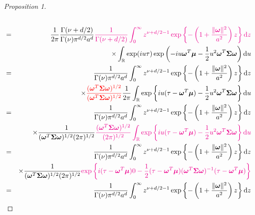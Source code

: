 \documentclass[12pt]{article}
\newcommand{\0}{\mathbf{0}}
\newtheorem{proof}{Proof}
\begin{document}
\begin{proof}[Proposition 1]
\begin{eqnarray}
&&  \label{eqn:gneitingspectraldensitymatern}  \\
&=&\frac{1}{2\pi}\frac{\Gamma(\nu+d/2)}{ \Gamma(\nu)\pi^{d/2}a^{d}} \textcolor{magenta}{\frac{1}{\Gamma(\nu+d/2)}\int_0^{\infty}z^{\nu+d/2-1} \exp\left\{-\left(1+\frac{ \|\boldsymbol{\omega}\|^2}{a^2}\right)z\right\}\dd z}\nonumber \\
&&\times  \int_{\mathbb{R}} \exp(iu\tau) \exp\left(-iu\boldsymbol{\omega}^T\boldsymbol{\mu}-\frac{1}{2}u^2\boldsymbol{\omega}^T\boldsymbol{\Sigma}\boldsymbol{\omega}\right) \dd u 
\label{eqn:rational_function_integral_form} \\
&=&\frac{1}{ \Gamma(\nu)\pi^{d/2}a^{d}} \int_0^{\infty}z^{\nu+d/2-1} \exp\left\{-\left(1+\frac{ \|\boldsymbol{\omega}\|^2}{a^2}\right)z\right\}\dd z\nonumber \\
&&\times \textcolor{red}{\frac{(\boldsymbol{\omega}^T\boldsymbol{\Sigma}\boldsymbol{\omega})^{1/2}}{(\boldsymbol{\omega}^T\boldsymbol{\Sigma}\boldsymbol{\omega})^{1/2}}}\frac{1}{2\pi} \int_{\mathbb{R}} \exp\left\{iu(\tau-\boldsymbol{\omega}^T\boldsymbol{\mu})-\frac{1}{2}u^2\boldsymbol{\omega}^T\boldsymbol{\Sigma}\boldsymbol{\omega}\right\} \dd u  \nonumber \\
&=&\frac{1}{ \Gamma(\nu)\pi^{d/2}a^{d}} \int_0^{\infty}z^{\nu+d/2-1} \exp\left\{-\left(1+\frac{ \|\boldsymbol{\omega}\|^2}{a^2}\right)z\right\}\dd z\nonumber \\
&& \times \frac{1}{(\boldsymbol{\omega}^T\boldsymbol{\Sigma}\boldsymbol{\omega})^{1/2}(2\pi)^{1/2}}\textcolor{magenta}{\frac{(\boldsymbol{\omega}^T\boldsymbol{\Sigma}\boldsymbol{\omega})^{1/2}}{(2\pi)^{1/2}} \int_{\mathbb{R}} \exp\left\{iu(\tau-\boldsymbol{\omega}^T\boldsymbol{\mu})-\frac{1}{2}u^2\boldsymbol{\omega}^T\boldsymbol{\Sigma}\boldsymbol{\omega}\right\} \dd u } \label{eqn:CFofGaussian1} \\
&=&\frac{1}{ \Gamma(\nu)\pi^{d/2}a^{d}} \int_0^{\infty}z^{\nu+d/2-1} \exp\left\{-\left(1+\frac{ \|\boldsymbol{\omega}\|^2}{a^2}\right)z\right\} \dd z \nonumber \\
&&\times \frac{1}{(\boldsymbol{\omega}^T\boldsymbol{\Sigma}\boldsymbol{\omega})^{1/2}(2\pi)^{1/2}} \textcolor{magenta}{ \exp\left\{i(\tau-\boldsymbol{\omega}^T\boldsymbol{\mu})0-\frac{1}{2}(\tau-\boldsymbol{\omega}^T\boldsymbol{\mu})(\boldsymbol{\omega}^T\boldsymbol{\Sigma}\boldsymbol{\omega})^{-1}(\tau-\boldsymbol{\omega}^T\boldsymbol{\mu})\right\}}  \nonumber \\
&=&\frac{1}{ \Gamma(\nu)\pi^{d/2}a^{d}} \int_0^{\infty}z^{\nu+d/2-1} \exp\left\{-\left(1+\frac{ \|\boldsymbol{\omega}\|^2}{a^2}\right)z\right\} \dd z \nonumber \\

\end{eqnarray}
\end{proof}
\end{document}
